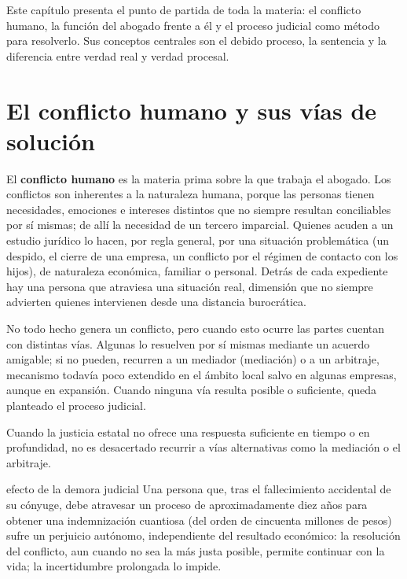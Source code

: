 \documentclass[12pt,oneside]{book}
\begin{document}
Este capítulo presenta el punto de partida de toda la materia: el conflicto humano, la función del abogado frente a él y el proceso judicial como método para resolverlo. Sus conceptos centrales son el debido proceso, la sentencia y la diferencia entre verdad real y verdad procesal.

\section{El conflicto humano y sus vías de solución}

El \textbf{conflicto humano} es la materia prima sobre la que trabaja el abogado. Los conflictos son inherentes a la naturaleza humana, porque las personas tienen necesidades, emociones e intereses distintos que no siempre resultan conciliables por sí mismas; de allí la necesidad de un tercero imparcial. Quienes acuden a un estudio jurídico lo hacen, por regla general, por una situación problemática (un despido, el cierre de una empresa, un conflicto por el régimen de contacto con los hijos), de naturaleza económica, familiar o personal. Detrás de cada expediente hay una persona que atraviesa una situación real, dimensión que no siempre advierten quienes intervienen desde una distancia burocrática.

No todo hecho genera un conflicto, pero cuando esto ocurre las partes cuentan con distintas vías. Algunas lo resuelven por sí mismas mediante un acuerdo amigable; si no pueden, recurren a un mediador (mediación) o a un arbitraje, mecanismo todavía poco extendido en el ámbito local salvo en algunas empresas, aunque en expansión. Cuando ninguna vía resulta posible o suficiente, queda planteado el proceso judicial.

\begin{importante}
Cuando la justicia estatal no ofrece una respuesta suficiente en tiempo o en profundidad, no es desacertado recurrir a vías alternativas como la mediación o el arbitraje.
\end{importante}

\begin{ejemplo}{efecto de la demora judicial}
Una persona que, tras el fallecimiento accidental de su cónyuge, debe atravesar un proceso de aproximadamente diez años para obtener una indemnización cuantiosa (del orden de cincuenta millones de pesos) sufre un perjuicio autónomo, independiente del resultado económico: la resolución del conflicto, aun cuando no sea la más justa posible, permite continuar con la vida; la incertidumbre prolongada lo impide.
\end{ejemplo}
\end{document}
